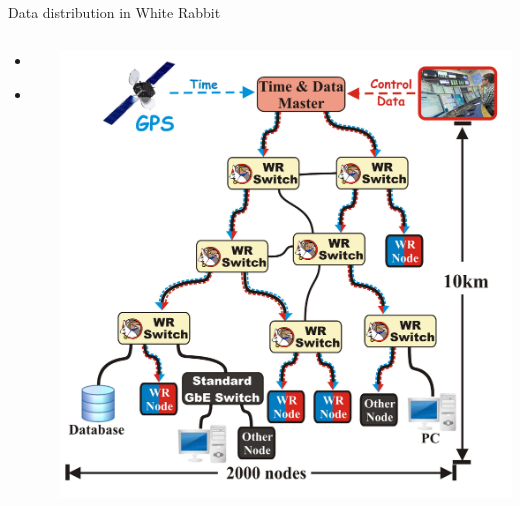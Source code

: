\documentclass[compress,red]{beamer}
\begin{document}
\subsection{}
\begin{frame}{Data distribution in White Rabbit}


\begin{columns}[c]
 
  \begin{itemize}
    \item \color{gray}{High accuracy/precision synchronization}
    \item \textbf{\color{red}{Deterministic, reliable and low-latency Control Data delivery}}
  \end{itemize}

    \begin{center}
    \includegraphics[height=1.0\textwidth]{network/wr_network-enhanced_pro.pdf}
    \end{center}
\end{columns}

\end{frame}
\end{document}
